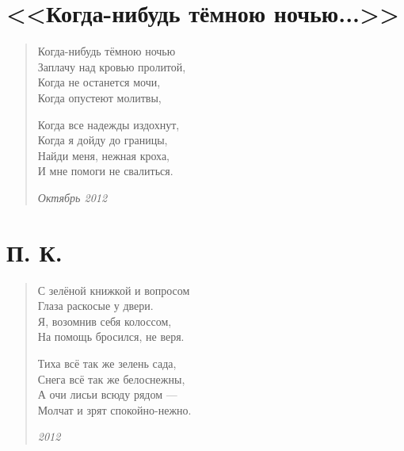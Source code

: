 
\tableofcontents

\pagestyle{fancy}


\section{<<Когда-нибудь тёмною ночью...>>}

\begin{verse}
Когда-нибудь тёмною ночью\\
Заплачу над кровью пролитой,\\
Когда не останется мочи,\\
Когда опустеют молитвы,

Когда все надежды издохнут,\\
Когда я дойду до границы,\\
Найди меня, нежная кроха,\\
И мне помоги не свалиться.

\emph{Октябрь 2012}
\end{verse}
\newpage

\section{П. К.}

\begin{verse}
С зелёной книжкой и вопросом\\
Глаза раскосые у двери.\\
Я, возомнив себя колоссом,\\
На помощь бросился, не веря.

Тиха всё так же зелень сада,\\
Снега всё так же белоснежны,\\
А очи лисьи всюду рядом ---\\
Молчат и зрят спокойно-нежно.

\emph{2012}
\end{verse}
\newpage

